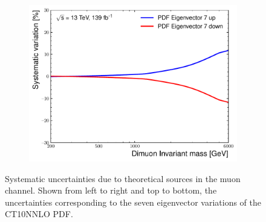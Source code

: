 \begin{figure}[h!]
\begin{subfigure}[b]{0.42\textwidth}
        \includegraphics[width=\textwidth]{figures/analysis/datamc/Uncertainties/theory/mm/backgroundTemplate_KF_PDF_EV7.pdf}
        \label{fig:uncert:mmpdfvar7}
    \end{subfigure}
    \caption{Systematic uncertainties due to theoretical sources in the muon channel. Shown from left to right and top to bottom, the uncertainties corresponding to the seven eigenvector variations of the CT10NNLO PDF.}
    \label{fig:ucnert:mmpdfvar}
\end{figure}

